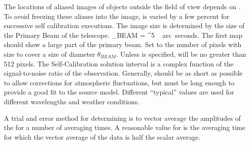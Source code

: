 The locations of aliased images of objects outside the field of
view depends on \CELLS.  To avoid freezing these aliases into the
image, \CELLS is varied by a few percent for successive self
calibration executions.
\myitem{\IMSIZ} The image size is determined by the size of the
Primary Beam of the telescope.
\beq
\theta_{BEAM} =   ^{5} ~
arc~seconds.
\eeq
The first map should show a large part of the primary beam.
Set \IMSIZ to the number of pixels with size \CELLS to cover
a size of diameter $\theta_{BEAM}$.
Unless \IMSIZ is specified, \IMSIZ will be no greater than 512 pixels.
\myitem{\SOLINT} The Self-Calibration solution interval is a complex
function of the signal-to-noise ratio of the observation.
Generally, \SOLINT should be as short as possible to allow corrections
for atmospheric fluctuations, but must be long enough to provide
a good fit to the source model.
Different ``typical'' values are used for different wavelengths and
weather conditions.

A trial and error method for determining \SOLINT is to vector average
the amplitudes of
the \uvdata for a number of averaging times.  A reasonable
value for \SOLINT is the averaging time for which the vector average
of the data is half the scalar average.

